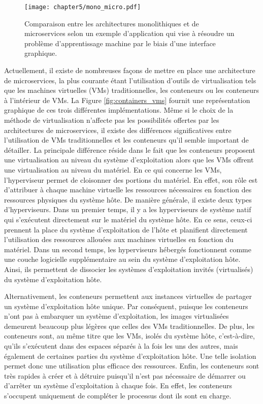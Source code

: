 \begin{figure}[H]
	\centering
	\texttt{[image: chapter5/mono\_micro.pdf]}
		\caption{Comparaison entre les architectures monolithiques et de microservices selon un exemple d'application qui vise à résoudre un problème d'apprentissage machine par le biais d'une interface graphique.}
	\label{fig:mono_micro}
\end{figure}

Actuellement, il existe de nombreuses façons de mettre en place une architecture de microservices, la plus courante étant l'utilisation d'outils de virtualisation tels que les machines virtuelles (\acsp{VM}) traditionnelles, les conteneurs ou les conteneurs à l'intérieur de \acsp{VM}. La Figure \ref{fig:containers_vms} fournit une représentation graphique de ces trois différentes implémentations. Même si le choix de la méthode de virtualisation n'affecte pas les possibilités offertes par les architectures de microservices, il existe des différences significatives entre l'utilisation de \acsp{VM} traditionnelles et les conteneurs qu'il semble important de détailler. La principale différence réside dans le fait que les conteneurs proposent une virtualisation au niveau du système d'exploitation alors que les \acsp{VM} offrent une virtualisation au niveau du matériel. En ce qui concerne les \acsp{VM}, l'hyperviseur permet de cloisonner des portions du matériel. En effet, son rôle est d'attribuer à chaque machine virtuelle les ressources nécessaires en fonction des ressources physiques du système hôte. De manière générale, il existe deux types d'hyperviseurs. Dans un premier temps, il y a les hyperviseurs de système natif qui s'exécutent directement sur le matériel du système hôte. En ce sens, ceux-ci prennent la place du système d'exploitation de l'hôte et planifient directement l'utilisation des ressources allouées aux machines virtuelles en fonction du matériel. Dans un second temps, les hyperviseurs hébergés fonctionnent comme une couche logicielle supplémentaire au sein du système d'exploitation hôte. Ainsi, ils permettent de dissocier les systèmes d'exploitation invités (virtualisés) du système d'exploitation hôte.

Alternativement, les conteneurs permettent aux instances virtuelles de partager un système d'exploitation hôte unique. Par conséquent, puisque les conteneurs n'ont pas à embarquer un système d'exploitation, les images virtualisées demeurent beaucoup plus légères que celles des \acsp{VM} traditionnelles. De plus, les conteneurs sont, au même titre que les \acsp{VM}, isolés du système hôte, c'est-à-dire, qu'ils s'exécutent dans des espaces séparés à la fois les uns des autres, mais également de certaines parties du système d'exploitation hôte. Une telle isolation permet donc une utilisation plus efficace des ressources. Enfin, les conteneurs sont très rapides à créer et à détruire puisqu'il n'est pas nécessaire de démarrer ou d'arrêter un système d'exploitation à chaque fois. En effet, les conteneurs s'occupent uniquement de compléter le processus dont ils sont en charge.


